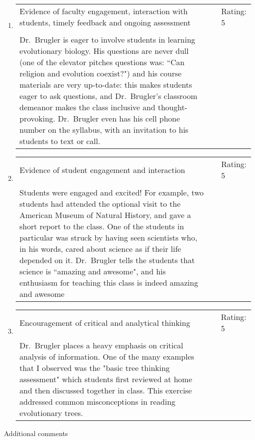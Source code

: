 \documentclass[11pt,dvipsnames]{article}
\begin{document}
\begin{enumerate}[label= {\bf  \arabic*:}]
\item 	\begin{tabular}[t]{p{} p{2cm} p{2cm} }
Evidence of faculty engagement, interaction with students, timely feedback and ongoing assessment & & Rating: 5 \\
& &\\
Dr.~Brugler is eager to involve students in learning evolutionary biology. His questions are never dull (one of the elevator pitches questions was: ``Can religion and evolution coexist?") and his course materials are very up-to-date: this makes students eager to ask questions, and Dr.~Brugler's classroom demeanor makes the class inclusive and thought-provoking. Dr.~Brugler even has his cell phone number on the syllabus, with an invitation to his students to text or call. & & \\
\end{tabular}
\item 	\begin{tabular}[t]{p{} p{2cm} p{2cm} }
	Evidence of student engagement and interaction & & Rating: 5 \\
	& &\\
	Students were engaged and excited! For example, two students had attended the optional visit to the American Museum of Natural History, and gave a short report to the class. One of the students in particular was struck by having seen scientists who, in his words, cared about science as if their life depended on it. Dr.~Brugler tells the students that science is ``amazing and awesome", and his enthusiasm for teaching this class is indeed amazing and awesome & &\\
\end{tabular}
\item 	\begin{tabular}[t]{p{} p{2cm} p{2cm} }
	Encouragement of critical and analytical thinking & & Rating: 5\\
	& &\\
	Dr.~Brugler places a heavy emphasis on critical analysis of information. One of the many examples that I observed was the  "basic tree thinking assessment" which students first reviewed at home and then discussed together in class. This exercise addressed common misconceptions in reading evolutionary trees.
\end{tabular}
\end{enumerate}
\vskip 1cm
{\large Additional comments}
\end{document}

